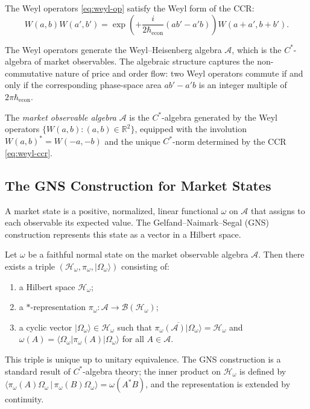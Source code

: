 The Weyl operators \eqref{eq:weyl-op} satisfy the Weyl form of the CCR:
\begin{equation}\label{eq:weyl-ccr}
    W(a, b) W(a', b') = \exp\!\left(+\frac{i}{2\hbar_{\mathrm{econ}}} (ab' - a'b)\right)
    W(a + a', b + b').
\end{equation}

The Weyl operators generate the Weyl--Heisenberg algebra $\mathcal{A}$, which is the
$C^*$-algebra of market observables. The algebraic structure captures the
non-commutative nature of price and order flow: two Weyl operators commute if and
only if the corresponding phase-space area $ab' - a'b$ is an integer multiple of
$2\pi\hbar_{\mathrm{econ}}$.

\begin{definition}\label{def:market-algebra}
The \emph{market observable algebra} $\mathcal{A}$ is the $C^*$-algebra generated by
the Weyl operators $\{W(a, b) : (a, b) \in \mathbb{R}^2\}$, equipped with the
involution $W(a, b)^* = W(-a, -b)$ and the unique $C^*$-norm determined by the CCR
\eqref{eq:weyl-ccr}.
\end{definition}

\subsection{The GNS Construction for Market States}

A market state is a positive, normalized, linear functional $\omega$ on
$\mathcal{A}$ that assigns to each observable its expected value. The
Gelfand--Naimark--Segal (GNS) construction represents this state as a vector in a
Hilbert space.

\begin{proposition}\label{def:gns}
Let $\omega$ be a faithful normal state on the market observable algebra
$\mathcal{A}$. Then there exists a triple
$(\mathcal{H}_\omega, \pi_\omega, |\Omega_\omega\rangle)$ consisting of:
\begin{enumerate}
    \item[(i)] a Hilbert space $\mathcal{H}_\omega$;
    \item[(ii)] a $*$-representation
        $\pi_\omega : \mathcal{A} \to \mathcal{B}(\mathcal{H}_\omega)$;
    \item[(iii)] a cyclic vector $|\Omega_\omega\rangle \in \mathcal{H}_\omega$ such
        that $\overline{\pi_\omega(\mathcal{A}) |\Omega_\omega\rangle} = \mathcal{H}_\omega$
        and $\omega(A) = \langle \Omega_\omega | \pi_\omega(A) | \Omega_\omega \rangle$
        for all $A \in \mathcal{A}$.
\end{enumerate}
This triple is unique up to unitary equivalence. The GNS construction is a standard
result of $C^*$-algebra theory; the inner product on $\mathcal{H}_\omega$ is defined by
$\langle \pi_\omega(A) \Omega_\omega \,|\, \pi_\omega(B) \Omega_\omega \rangle
= \omega(A^* B)$, and the representation is extended by continuity.
\end{proposition}

